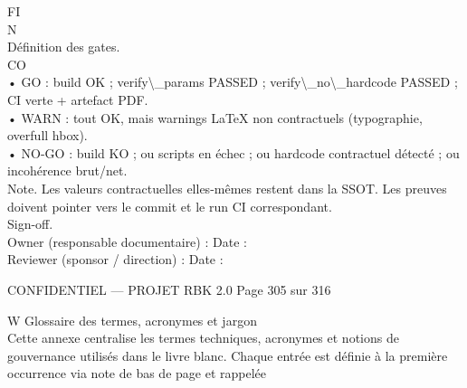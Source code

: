 \vspace{0.5em}
\vspace{0.5em}
FI\\
N\\
Définition des gates.\\
CO\\
• GO : build OK ; verify\textbackslash{}_params PASSED ; verify\textbackslash{}_no\textbackslash{}_hardcode PASSED ; CI verte + artefact PDF.\\
\vspace{0.5em}
• WARN : tout OK, mais warnings LaTeX non contractuels (typographie, overfull hbox).\\
\vspace{0.5em}
• NO-GO : build KO ; ou scripts en échec ; ou hardcode contractuel détecté ; ou incohérence brut/net.\\
\vspace{0.5em}
\vspace{0.5em}
Note. Les valeurs contractuelles elles-mêmes restent dans la SSOT. Les preuves doivent pointer vers le commit et le run CI correspondant.\\
\vspace{0.5em}
Sign-off.\\
\vspace{0.5em}
Owner (responsable documentaire) :                                                                                                                            Date :\\
\vspace{0.5em}
Reviewer (sponsor / direction) :                                                                                                                             Date :\\
\vspace{0.5em}
\vspace{0.5em}
\vspace{0.5em}
\vspace{0.5em}
\begin{confidential}CONFIDENTIEL — PROJET RBK 2.0                                                             Page 305 sur 316\end{confidential}
W \textbar{} Glossaire des termes, acronymes et jargon\\
\vspace{0.5em}
\vspace{0.5em}
Cette annexe centralise les termes techniques, acronymes et notions de gouvernance utilisés dans le livre blanc. Chaque entrée est définie à la première occurrence via note de bas de page et rappelée\\
